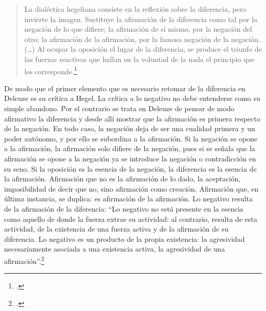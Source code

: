 \begin{quote}
La dialéctica hegeliana consiste en la reflexión sobre la diferencia,
pero invierte la imagen. Sustituye la afirmación de la diferencia como
tal por la negación de lo que difiere; la afirmación de sí mismo, por la
negación del otro; la afirmación de la afirmación, por la famosa
negación de la negación. (\dots) Al ocupar la oposición el lugar de
la diferencia, se produce el triunfo de las fuerzas reactivas que hallan
en la voluntad de la nada el principio que les corresponde.\footcite[272]{deleuze2005a}
\end{quote}

De modo que el primer elemento que es necesario retomar de la diferencia
en Deleuze es su crítica a Hegel. La crítica a lo negativo no debe
entenderse como su simple abandono. Por el contrario se trata en Deleuze
de pensar de modo afirmativo la diferencia y desde allí mostrar que la
afirmación es primera respecto de la negación. En todo caso, la negación
deja de ser una cualidad primera y un poder autónomo, y por ello se
subordina a la afirmación. Si la negación se opone a la afirmación, la
afirmación solo difiere de la negación, pues si se señala que la
afirmación se opone a la negación ya se introduce la negación o
contradicción en su seno. Si la oposición es la esencia de la negación,
la diferencia es la esencia de la afirmación. Afirmación que no es la
afirmación de lo dado, la aceptación, imposibilidad de decir que no,
sino afirmación como creación. Afirmación que, en última instancia, se
duplica: es afirmación de la afirmación. Lo negativo resulta de la
afirmación de la diferencia: \enquote{Lo negativo no está presente en la esencia
como aquello de donde la fuerza extrae su actividad: al contrario,
resulta de esta actividad, de la existencia de una fuerza activa y de la
afirmación de su diferencia. Lo negativo es un producto de la propia
existencia: la agresividad necesariamente asociada a una existencia
activa, la agresividad de una afirmación}.\footcite[17]{deleuze2005a}

